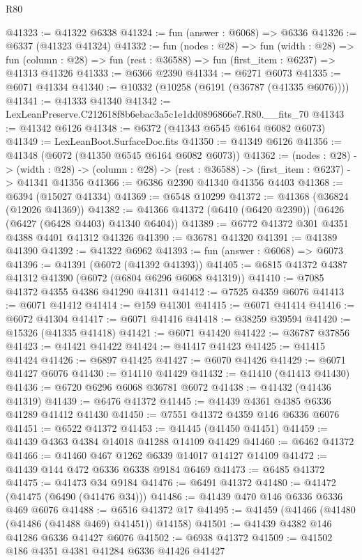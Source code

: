 \begin{lexlean}{R80}
\begin{coremodule}
@41323 := @41322 @6338
@41324 := fun (answer : @6068) => @6336
@41326 := @6337 (@41323 @41324)
@41332 := fun (nodes : @28) =>
  fun (width : @28) =>
  fun (column : @28) => fun (rest : @36588) => fun (first_item : @6237) => @41313 @41326
@41333 := @6366 @2390
@41334 := @6271 @6073
@41335 := @6071 @41334
@41340 := @10332 (@10258 (@6191 (@36787 (@41335 @6076))))
@41341 := @41333 @41340
@41342 := LexLeanPreserve.C212618f8b6ebac3a5c1e1dd0896866e7.R80.__fits_70
@41343 := @41342 @6126
@41348 := @6372 (@41343 @6545 @6164 @6082 @6073)
@41349 := LexLeanBoot.SurfaceDoc.fits
@41350 := @41349 @6126
@41356 := @41348 (@6072 (@41350 @6545 @6164 @6082 @6073))
@41362 := (nodes : @28) ->
  (width : @28) -> (column : @28) -> (rest : @36588) -> (first_item : @6237) -> @41341 @41356
@41366 := @6386 @2390 @41340 @41356 @4403
@41368 := @6394 (@15027 @41334)
@41369 := @6548 @10299
@41372 := @41368 (@36824 (@12026 @41369))
@41382 := @41366 @41372 (@6410 (@6420 @2390)) (@6426 (@6427 (@6428 @4403) @41340 @6404))
@41389 := @6772 @41372 @301 @4351 @4388 @4401 @41312 @41326
@41390 := @36781 @41320
@41391 := @41389 @41390
@41392 := @41322 @6962
@41393 := fun (answer : @6068) => @6073
@41396 := @41391 (@6072 (@41392 @41393))
@41405 := @6815 @41372 @4387 @41312 @41390 (@6072 (@6804 @6296 @6068 @41319))
@41410 := @7085 @41372 @4355 @4386 @41290 @41311
@41412 := @7525 @4359 @6076
@41413 := @6071 @41412
@41414 := @159 @41301
@41415 := @6071 @41414
@41416 := @6072 @41304
@41417 := @6071 @41416
@41418 := @38259 @39594
@41420 := @15326 (@41335 @41418)
@41421 := @6071 @41420
@41422 := @36787 @37856
@41423 := @41421 @41422
@41424 := @41417 @41423
@41425 := @41415 @41424
@41426 := @6897 @41425
@41427 := @6070 @41426
@41429 := @6071 @41427 @6076
@41430 := @14110 @41429
@41432 := @41410 (@41413 @41430)
@41436 := @6720 @6296 @6068 @36781 @6072
@41438 := @41432 (@41436 @41319)
@41439 := @6476 @41372
@41445 := @41439 @4361 @4385 @6336 @41289 @41412 @41430
@41450 := @7551 @41372 @4359 @146 @6336 @6076
@41451 := @6522 @41372
@41453 := @41445 (@41450 @41451)
@41459 := @41439 @4363 @4384 @14018 @41288 @14109 @41429
@41460 := @6462 @41372
@41466 := @41460 @467 @1262 @6339 @14017 @14127 @14109
@41472 := @41439 @144 @472 @6336 @6338 @9184 @6469
@41473 := @6485 @41372
@41475 := @41473 @34 @9184
@41476 := @6491 @41372
@41480 := @41472 (@41475 (@6490 (@41476 @34)))
@41486 := @41439 @470 @146 @6336 @6336 @469 @6076
@41488 := @6516 @41372 @17
@41495 := @41459 (@41466 (@41480 (@41486 (@41488 @469) @41451)) @14158)
@41501 := @41439 @4382 @146 @41286 @6336 @41427 @6076
@41502 := @6938 @41372
@41509 := @41502 @186 @4351 @4381 @41284 @6336 @41426 @41427

\end{coremodule}
\end{lexlean}
